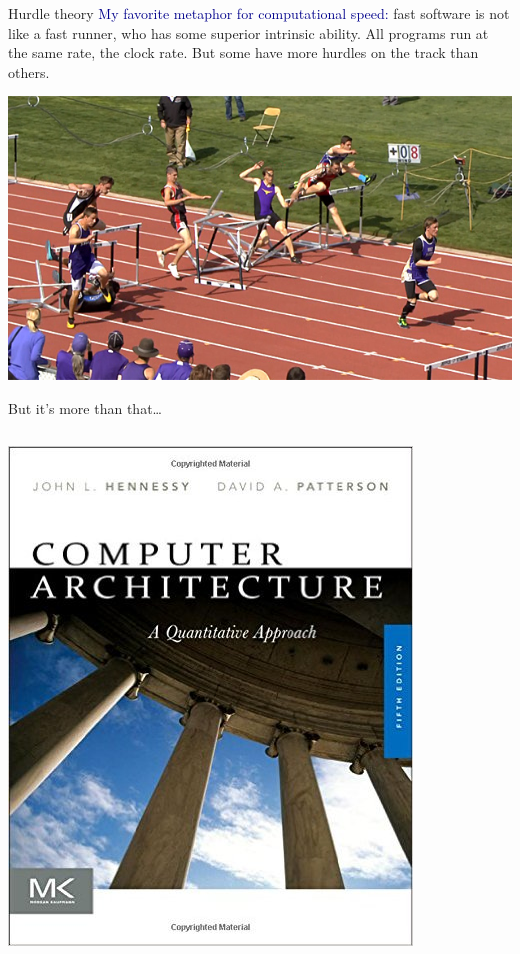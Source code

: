 \documentclass{beamer}
\begin{document}
\begin{frame}{Hurdle theory}
\vspace{0.5 cm}
\textcolor{darkblue}{My favorite metaphor for computational speed:} fast software is not like a fast runner, who has some superior intrinsic ability. All programs run at the same rate, the clock rate. But some have more hurdles on the track than others.

\vspace{0.25 cm}
\begin{center}
\includegraphics[width=0.7\linewidth]{hurdle9.jpg}
\end{center}
\end{frame}

\begin{frame}{But it's more than that\ldots}
\begin{columns}

\includegraphics[width=\linewidth]{hennessy.jpg}

\end{columns}
\end{frame}
\end{document}
